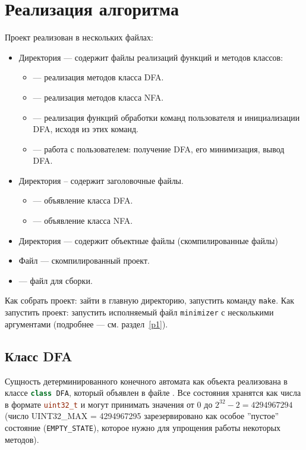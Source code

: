 \documentclass{article}
\begin{document}
\section{Реализация алгоритма}
Проект реализован в нескольких файлах:
\begin{itemize}
  \item Директория  --- содержит файлы реализаций функций и методов классов:
  \begin{itemize}
    \item[\ding{118}]  --- реализация методов класса DFA.
    \item[\ding{118}]  --- реализация методов класса NFA.
    \item[\ding{118}]  --- реализация функций обработки команд пользователя и инициализации DFA, исходя из этих команд.
    \item[\ding{118}]  --- работа с пользователем: получение DFA, его минимизация, вывод DFA.
  \end{itemize}
  \item Директория  -- содержит заголовочные файлы.
  \begin{itemize}
    \item[\ding{118}]  --- объявление класса DFA.
    \item[\ding{118}]  --- объявление класса NFA.
  \end{itemize}
  \item Директория  --- содержит объектные файлы (скомпилированные  файлы)
  \item Файл  --- скомпилированный проект.
  \item {} --- файл для сборки.
\end{itemize}
Как собрать проект: зайти в главную директорию, запустить команду \lstinline[language=C++]!make!. Как запустить проект: запустить исполняемый файл \lstinline[language=C++]!minimizer! с несколькими аргументами (подробнее --- см. раздел~\ref{p1}).
\subsection{Класс DFA}
Сущность детерминированного конечного автомата как объекта реализована в классе \lstinline[language=C++]!class DFA!, который объявлен в файле . Все состояния хранятся как числа в формате \lstinline[language=C++]!uint32_t! и могут принимать значения от 0 до $2^{32} - 2 = 4294967294$ (число UINT32\_MAX = 4294967295 зарезервировано как особое ''пустое'' состояние (\lstinline[language=C++]!EMPTY_STATE!), которое нужно для упрощения работы некоторых методов).
\end{document}
